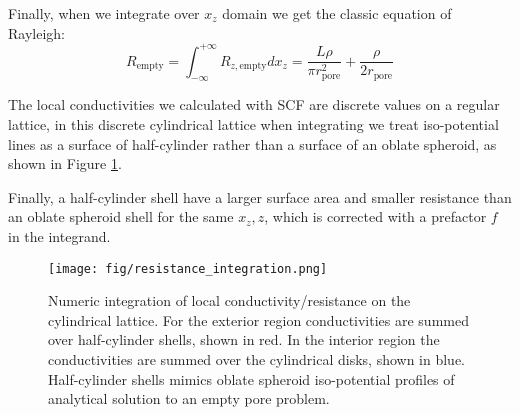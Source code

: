 \documentclass[10pt, a4paper]{article}
\newcommand\todo[1]{\textcolor{red}{#1}}
\begin{document}
\begin{multicols}{2}
Finally, when we integrate over $x_z$ domain we get the classic equation of Rayleigh:
\begin{equation}
    \label{eq:r_empty}
    R_{\textrm{empty}} = \int_{-\infty}^{+\infty} R_{z, \textrm{empty}} dx_z
    =\frac{L \rho}{\pi r_{\textrm{pore}}^2} + \frac{\rho}{2 r_{\textrm{pore}}}
\end{equation}



The local conductivities we calculated with SCF are discrete values on a regular lattice, in this discrete cylindrical lattice when integrating we treat iso-potential lines as a surface of half-cylinder rather than a surface of an oblate spheroid, as shown in Figure \ref{fig:integration_scheme}.

Finally, a half-cylinder shell have a larger surface area and smaller resistance than an oblate spheroid shell for the same $x_{z}, z$, which is corrected with a prefactor $f$ in the integrand.

\begin{figure}[H]
    \centering
    \texttt{[image: fig/resistance\_integration.png]}
    \caption{
        Numeric integration of local conductivity/resistance on the cylindrical lattice. 
        For the exterior region conductivities are summed over half-cylinder shells, shown in red.
        In the interior region the conductivities are summed over the cylindrical disks, shown in blue.
        Half-cylinder shells mimics oblate spheroid iso-potential profiles of analytical solution to an empty pore problem.
        }
    \label{fig:integration_scheme}
\end{figure}


\end{multicols}
\end{document}
